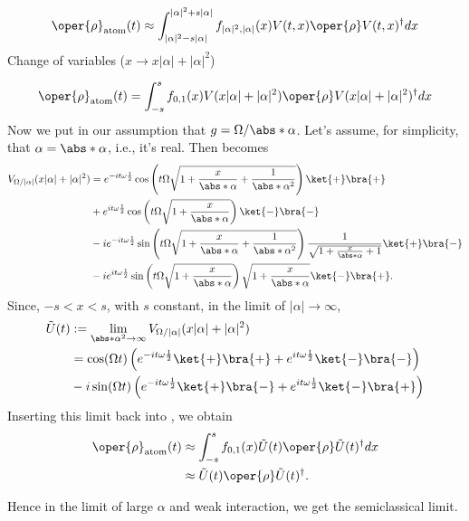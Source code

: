\begin{equation}
    \oper{\rho}_{\text{atom}}(t)\approx \int_{|\alpha|^2 - s|\alpha|}^{|\alpha|^2 + s|\alpha|} f_{|\alpha|^2, |\alpha|}(x) V(t, x) \oper{\rho} V(t, x)^{\dagger} dx
\end{equation}
Change of variables (\( x \to x|\alpha| + |\alpha|^2 \))

\begin{equation}
    \label{eq:appen_JCM_rho_atom_t}
    \begin{aligned}
        \oper{\rho}_{\text{atom}}(t)= \int_{-s}^{s} f_{0,1}(x) V(x|\alpha| + |\alpha|^2) 
    \oper{\rho} V(x|\alpha| + |\alpha|^2)^{\dagger} dx
    \end{aligned}
\end{equation}
Now we put in our assumption that \(g = \Omega / \abs*{\alpha}\). Let's assume, 
for simplicity, that \(\alpha = \abs*{\alpha}\), i.e., it's real. Then  becomes
\begin{align}
    V_{\Omega/|\alpha|}(x|\alpha| + |\alpha|^2) 
    &= e^{-i t \omega \frac{1}{2}}\cos \left( t\Omega \sqrt{1 + \frac{x}{\abs*{\alpha}}+ \frac{1}{\abs*{\alpha}^2}} \right) \ket{+}\bra{+} \nonumber \\
    &+ e^{i t \omega \frac{1}{2} }\cos \left( t\Omega \sqrt{1 + \frac{x}{\abs*{\alpha}}} \right) \ket{-}\bra{-} \nonumber \\
    &- i e^{-i t \omega \frac{1}{2} }\sin \left( t\Omega \sqrt{1 + \frac{x}{\abs*{\alpha}} + \frac{1}{\abs*{\alpha}^2}} \right) \frac{1}{\sqrt{1 + \frac{x}{\abs*{\alpha}} + 1}} \ket{+}\bra{-} \nonumber \\
    &- i e^{i t \omega \frac{1}{2}} \sin \left( t\Omega \sqrt{1 + \frac{x}{\abs*{\alpha}}} \right) \sqrt{1 + \frac{x}{\abs*{\alpha}}} \ket{-}\bra{+}. \nonumber
\end{align}
Since, \(-s < x < s\), with \(s\) constant, in the limit of \(|\alpha| \to \infty\),
\begin{align}
    \tilde{U}(t) &:= \lim_{\abs*{\alpha}^2 \to \infty} 
    V_{\Omega/|\alpha|}(x|\alpha| + |\alpha|^2)  \nonumber \\
    &= \cos(\Omega t) \left(e^{-i t \omega \frac{1}{2}}\ket{+}\bra{+} + 
    e^{i t \omega \frac{1}{2}}\ket{-}\bra{-} \right)  \nonumber \\
    &- i \sin(\Omega t)
     \left( e^{-i t \omega \frac{1}{2}}\ket{+}\bra{-}
    + e^{i t \omega \frac{1}{2}}\ket{-}\bra{+}\right)  \nonumber \\
\end{align}
Inserting this limit back into , we obtain
\begin{align}
    \oper{\rho}_{\text{atom}}(t) &\approx \int_{-s}^{s} f_{0,1}(x) \tilde{U}(t) \oper{\rho} \tilde{U}(t)^{\dagger} dx \nonumber\\
        &\approx \tilde{U}(t) \oper{\rho} \tilde{U}(t)^{\dagger}.
\end{align}

Hence in the limit of large \(\alpha\) and weak interaction, we get the 
semiclassical limit. 